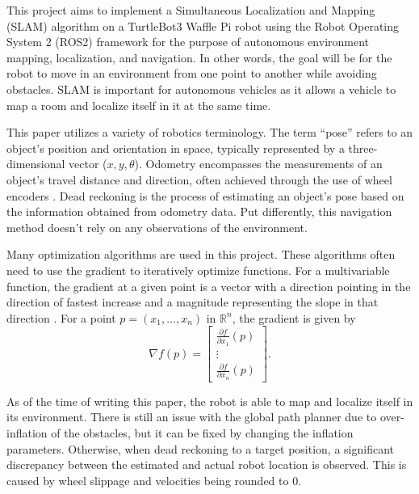 This project aims to implement a Simultaneous Localization and Mapping (SLAM) algorithm on a TurtleBot3 Waffle Pi robot using the Robot Operating System 2 (ROS2) framework for the purpose of autonomous environment mapping, localization, and navigation. In other words, the goal will be for the robot to move in an environment from one point to another while avoiding obstacles. SLAM is important for autonomous vehicles as it allows a vehicle to map a room and localize itself in it at the same time.

This paper utilizes a variety of robotics terminology. The term ``pose'' refers to an object's position and orientation in space, typically represented by a three-dimensional vector ($x,y,\theta$). Odometry encompasses the measurements of an object's travel distance and direction, often achieved through the use of wheel encoders \parencite{corkeRoboticsVisionControl2023}. Dead reckoning is the process of estimating an object's pose based on the information obtained from odometry data. Put differently, this navigation method doesn't rely on any observations of the environment.

Many optimization algorithms are used in this project. These algorithms often need to use the gradient to iteratively optimize functions. For a multivariable function, the gradient at a given point is a vector with a direction pointing in the direction of fastest increase and a magnitude representing the slope in that direction \parencite{Gradient2024}. For a point $p = (x_1,\hdots, x_n)$ in $\mathbb{R}^n$, the gradient is given by
\[
    \nabla f(p)=\begin{bmatrix}
        \frac{\partial f}{\partial x_1}(p) \\[6pt]
        \vdots                             \\[6pt]
        \frac{\partial f}{\partial x_n}(p)
    \end{bmatrix}.
\]

As of the time of writing this paper, the robot is able to map and localize itself in its environment. There is still an issue with the global path planner due to over-inflation of the obstacles, but it can be fixed by changing the inflation parameters. Otherwise, when dead reckoning to a target position, a significant discrepancy between the estimated and actual robot location is observed. This is caused by wheel slippage and velocities being rounded to 0.